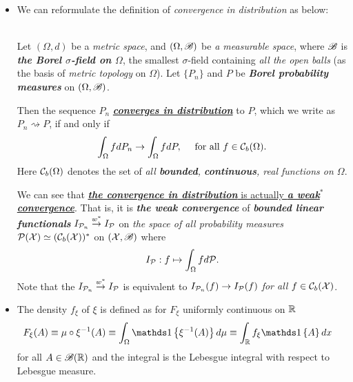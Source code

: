 \documentclass[11pt]{article}
\begin{document}
\begin{itemize}
\item We can reformulate the definition of \emph{convergence in distribution} as below:
\begin{definition} \citep{wellner2013weak}\\
Let $(\Omega, d)$ be a \emph{metric space}, and $(\Omega, {\mathscr B})$ be \emph{a measurable space}, where ${\mathscr B}$ is \emph{\textbf{the Borel $\sigma$-field on $\Omega$}}, the smallest $\sigma$-field containing \emph{all the open balls} (as the basis of \emph{metric topology} on $\Omega$). Let $\{P_n \}$ and $P$ be \emph{\textbf{Borel probability measures}} on $(\Omega, {\mathscr B})$.

Then the sequence $P_n$ \underline{\emph{\textbf{converges in distribution}}} to $P$, which we write as $P_n \rightsquigarrow P$, if and only if
\begin{align*}
\int_{\Omega} f dP_n \rightarrow \int_{\Omega} f dP, \quad \text{ for all } f \in {\mathcal C}_{b}(\Omega).
\end{align*}
Here ${\mathcal C}_{b}(\Omega)$ denotes the set of \emph{all \textbf{bounded}, \textbf{continuous}, real functions on $\Omega$}.
\end{definition} 
We can see that \underline{\emph{\textbf{the convergence in distribution}} is actually \emph{\textbf{a weak$^{*}$ convergence}}}. That is, it is \emph{\textbf{the weak convergence}} of  \emph{\textbf{bounded linear functionals}} $I_{{\mathcal P}_n} \stackrel{w^{*}}{\rightarrow} I_{{\mathcal P}}$ on \emph{the space of all probability measures} ${\mathcal P}({\mathcal X}) \simeq ({\mathcal C}_{b}({\mathcal X}))^{*}$ on $({\mathcal X}, {\mathscr B})$ where 
\begin{align*}
I_{{\mathcal P}}: f \mapsto \int_{\Omega} f d{\mathcal P}.
\end{align*} Note that the $I_{{\mathcal P}_n} \stackrel{w^{*}}{\rightarrow} I_{{\mathcal P}}$ is equivalent to $I_{{\mathcal P}_n}(f) \rightarrow I_{{\mathcal P}}(f)$ \emph{for all $f \in  {\mathcal C}_{b}({\mathcal X})$}.





\item \begin{remark}
The density $f_{\xi}$ of $\xi$ is defined as for $F_{\xi}$ uniformly continuous on ${\mathbb R}$
\begin{align*}
F_{\xi}(A) \equiv \mu\circ \xi^{-1}(A) \equiv \int_{\Omega}\ind{\xi^{-1}(A)} d\mu  &\equiv \int_{\bR} f_{\xi} \ind{A} dx
\end{align*} for all $A\in {\mathscr B}({\mathbb R})$ and the integral is the Lebesgue integral with respect to Lebesgue measure.
\end{remark}


\end{itemize}
\end{document}
